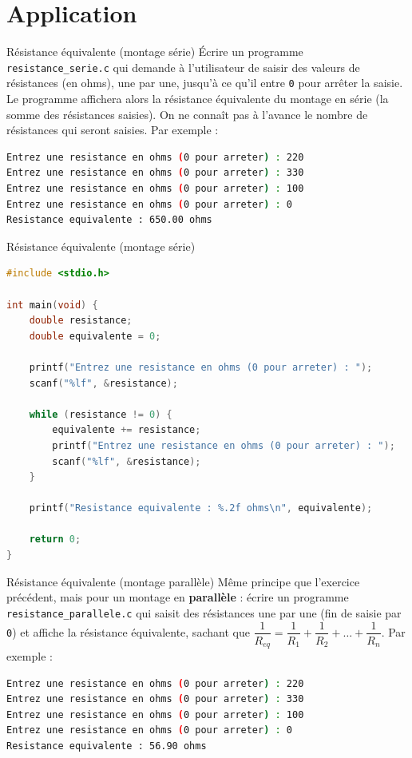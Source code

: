 \section{Application}

\begin{UPSTIexercice}{Résistance équivalente (montage série)}
	\UPSTIetape Écrire un programme \texttt{resistance\_serie.c} qui demande à l'utilisateur de saisir des valeurs de résistances (en ohms), une par une, jusqu'à ce qu'il entre \texttt{0} pour arrêter la saisie. Le programme affichera alors la résistance équivalente du montage en série (la somme des résistances saisies). On ne connaît pas à l'avance le nombre de résistances qui seront saisies.
	Par exemple :
	\begin{lstlisting}[language=bash,style=console]
Entrez une resistance en ohms (0 pour arreter) : 220
Entrez une resistance en ohms (0 pour arreter) : 330
Entrez une resistance en ohms (0 pour arreter) : 100
Entrez une resistance en ohms (0 pour arreter) : 0
Resistance equivalente : 650.00 ohms
\end{lstlisting}
\end{UPSTIexercice}

\begin{UPSTIcorrectionP}{Résistance équivalente (montage série)}
	\begin{lstlisting}[language=c]
#include <stdio.h>

int main(void) {
    double resistance;
    double equivalente = 0;

    printf("Entrez une resistance en ohms (0 pour arreter) : ");
    scanf("%lf", &resistance);

    while (resistance != 0) {
        equivalente += resistance;
        printf("Entrez une resistance en ohms (0 pour arreter) : ");
        scanf("%lf", &resistance);
    }

    printf("Resistance equivalente : %.2f ohms\n", equivalente);

    return 0;
}
	\end{lstlisting}
\end{UPSTIcorrectionP}

\begin{UPSTIexercice}{Résistance équivalente (montage parallèle)}
	\UPSTIetape Même principe que l'exercice précédent, mais pour un montage en \textbf{parallèle} : écrire un programme \texttt{resistance\_parallele.c} qui saisit des résistances une par une (fin de saisie par \texttt{0}) et affiche la résistance équivalente, sachant que $\dfrac{1}{R_{eq}} = \dfrac{1}{R_1} + \dfrac{1}{R_2} + \dots + \dfrac{1}{R_n}$.
	Par exemple :
	\begin{lstlisting}[language=bash,style=console]
Entrez une resistance en ohms (0 pour arreter) : 220
Entrez une resistance en ohms (0 pour arreter) : 330
Entrez une resistance en ohms (0 pour arreter) : 100
Entrez une resistance en ohms (0 pour arreter) : 0
Resistance equivalente : 56.90 ohms
\end{lstlisting}
\end{UPSTIexercice}


